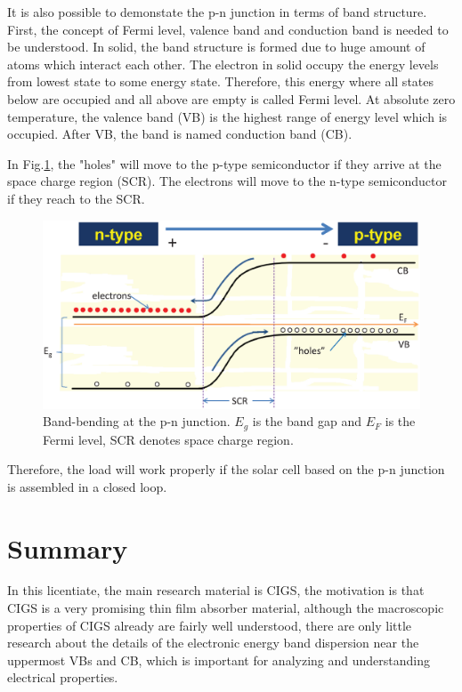 \documentclass[a4paper, 12pt, titlepage,oneside,drop]{kthesis}
\begin{document}
It is also possible to demonstate the p-n junction in terms of band structure. First, the concept of Fermi level, valence band and conduction band is needed to be understood.
In solid, the band structure is formed due to huge amount of atoms which interact each other. The electron in solid occupy the energy levels from lowest state to some
energy state. Therefore, this energy where all states below are occupied and all above are empty is called Fermi level. At absolute zero temperature, the valence band (VB) is the highest range of energy level which
is occupied. After VB, the band is named conduction band (CB).

In Fig.\ref{scr136}, the "holes" will move to the p-type semiconductor if they arrive at the space charge region (SCR). The electrons will move to the n-type semiconductor if they reach to the SCR.


\begin{figure}[H]
\centering
\includegraphics[scale=.5]{scr2}
\caption{Band-bending at the p-n junction. $E_g$ is the band gap and $E_F$ is the Fermi level, SCR denotes space charge region.}
\label{scr136}
\end{figure}

Therefore, the load will work properly if the solar cell based on the p-n junction is assembled in a closed loop.

\section{Summary}
In this licentiate, the main research material is CIGS, the motivation is that CIGS is a very promising thin film absorber material, although the macroscopic 
properties of CIGS already are fairly well understood, there are only little research about the details of the electronic energy band dispersion near the uppermost
VBs and CB, which is important for analyzing and understanding electrical properties. 
\end{document}
